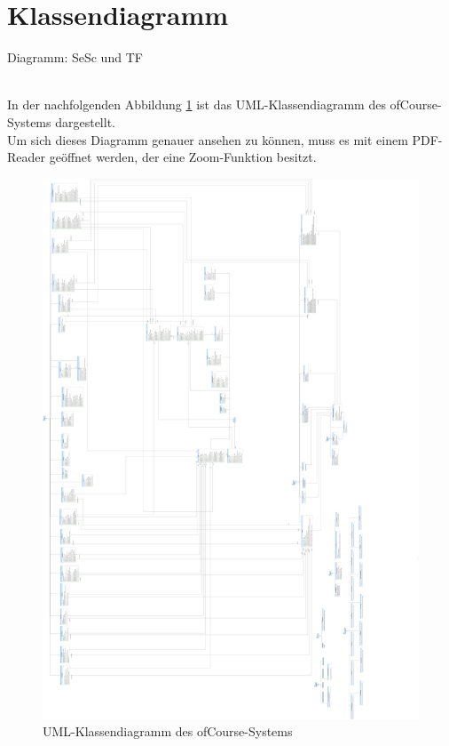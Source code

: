 	
	\section{Klassendiagramm}
	\begin{tiny}
		Diagramm: SeSc und TF\\
	\end{tiny}\\
	In der nachfolgenden Abbildung \ref{fig:classdiag} ist das UML-Klassendiagramm des ofCourse-Systems dargestellt.\\
	Um sich dieses Diagramm genauer ansehen zu können, muss es mit einem PDF-Reader
	geöffnet werden, der eine Zoom-Funktion besitzt.
	
	\begin{figure}[h]
		\centering
		\includegraphics[width=1\linewidth]{Grafiken/Klassendiagramm}
		\caption{UML-Klassendiagramm des ofCourse-Systems}
		\label{fig:classdiag}
	\end{figure}
	
